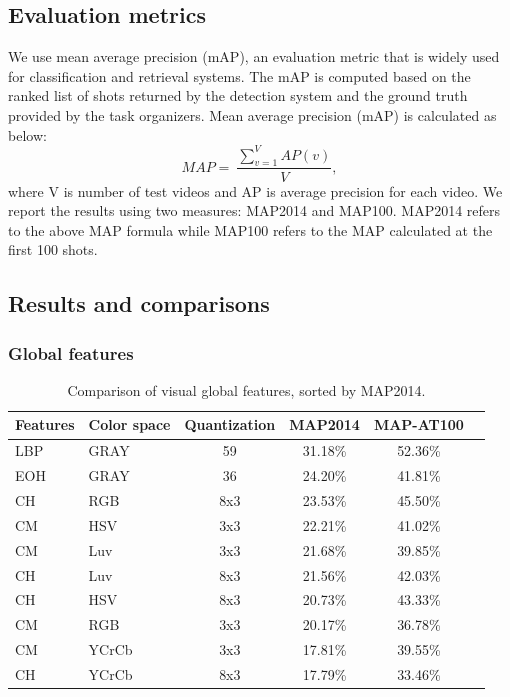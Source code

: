 \documentclass[twocolumn]{bmcart}%
\begin{document}
\subsection{Evaluation metrics}
We use mean average precision (mAP), an evaluation metric that is widely used for classification and retrieval systems. The mAP is computed based on the ranked list of shots returned by the detection system and the ground truth provided by the task organizers. Mean average precision (mAP) is calculated as below:
\[
MAP=\ \frac{\sum_{v=1}^VAP(v)}{V},
\]
where V is number of test videos and AP is average precision for each video. We report the results using two measures: MAP2014 and MAP100. MAP2014 refers to the above MAP formula while MAP100 refers to the MAP calculated at the first 100 shots.
\subsection{Results and comparisons}
\subsubsection{Global features}
\begin{table}
	\centering
	\caption{Comparison of visual global features, sorted by MAP2014.}
	\setlength{\tabcolsep}{4pt}
	\begin{tabular}{llcccc}
		\hline
		Features & Color space & Quantization & MAP2014 & MAP-AT100 \\ \hline
		LBP & GRAY  & 59    & 31.18\% & 52.36\% \\
		EOH & GRAY   & 36    & 24.20\% & 41.81\% \\
		CH & RGB   & 8x3   & 23.53\% & 45.50\% \\
		CM & HSV     & 3x3   & 22.21\% & 41.02\% \\
		CM & Luv      & 3x3   & 21.68\% & 39.85\% \\
		CH & Luv    & 8x3   & 21.56\% & 42.03\% \\
		CH & HSV    & 8x3   & 20.73\% & 43.33\% \\
		CM & RGB     & 3x3   & 20.17\% & 36.78\% \\
		CM & YCrCb   & 3x3   & 17.81\% & 39.55\% \\
		CH & YCrCb   & 8x3   & 17.79\% & 33.46\% \\ \hline
	\end{tabular}%
	\label{tab:global}%
\end{table}%
\end{document}
